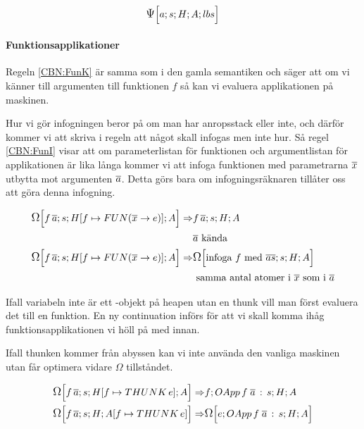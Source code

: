 \documentclass[../Optimise]{subfiles}
\begin{document}
\[
\CBNPSI sHA{lbs}a
\]

\begin{comment}
En annan ändring är att $\Psi$ numera tar en atom istället för en variabel
eftersom det inte bara är variabler som kan vara värden. Detta var en detalj
som missades i CBV-semantiken men som nu har rättats till.
\end{comment}

\paragraph{Funktionsapplikationer}
Regeln \eqref{CBN:FunK} är samma som i den gamla semantiken och säger att om vi känner till
argumenten till funktionen $f$ så kan vi evaluera applikationen på maskinen. 

Hur vi gör infogningen beror på om man har anropsstack eller inte, och därför kommer vi
att skriva i regeln att något skall infogas men inte hur. Så regel \eqref{CBN:FunI}
visar att om parameterlistan för funktionen och argumentlistan för applikationen är
lika långa kommer vi att infoga funktionen med parametrarna $\many{x}$ utbytta mot
argumenten $\many{a}$. Detta görs bara om infogningsräknaren tillåter oss att göra 
denna infogning.


\begin{align}
\label{CBN:FunK}\CBNOMEGA s{\heap f{\FUN{\many{x}}{e}}}A{f \, \many{a}} \Rightarrow & \CBNMC {f \, \many{a}}sHA \\
 & \many{a} \text{ kända } \nonumber \\
\label{CBN:FunI}\CBNOMEGA s{\heap f{\FUN{\many{x}}e}}A{f\, \many{a}} \Rightarrow & \CBNOMEGA sHA{\text{infoga } f \text{ med } \overline{as}} \\
 & \text{ samma antal atomer i } \many{x} \text{ som i } \many{a} \nonumber
\end{align}

Ifall variabeln inte är ett -objekt på heapen utan en thunk vill man först evaluera
det till en funktion. En ny continuation  införs för att vi skall komma ihåg
funktionsapplikationen vi höll på med innan.

Ifall thunken kommer från abyssen kan vi inte använda den vanliga maskinen utan får
optimera vidare $\Omega$ tillståndet.

\begin{align}
\CBNOMEGA s{\heap f{\THUNK e}}A{f\, \many{a}}  \Rightarrow & \CBNMC f{\cOApp f{\many{a}}s}HA\\
\CBNOMEGA sH{\abyss f{\THUNK e}}{f\, \many{a}}  \Rightarrow & \CBNOMEGA{\cOApp f{\many{a}}s}HAe
\end{align}
\end{document}
